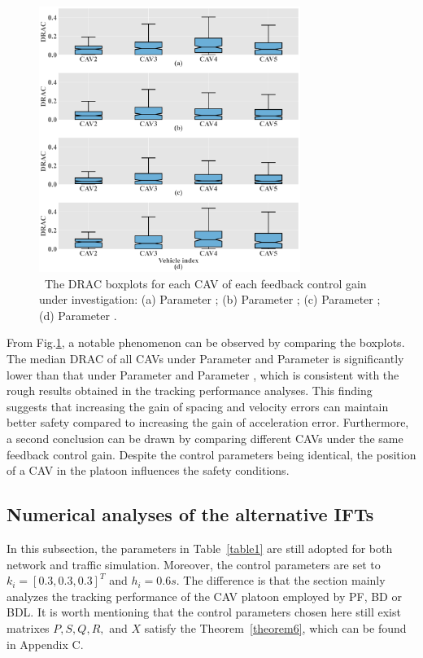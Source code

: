 \documentclass[journal]{IEEEtran}
\begin{document}
\begin{figure}

  \centering
  \includegraphics[width=8.5cm]{figs/fig8.png}
  \caption{~The DRAC boxplots for each CAV of each feedback control gain under investigation: (a) Parameter \uppercase\expandafter{}; (b) Parameter \uppercase\expandafter{}; (c) Parameter \uppercase\expandafter{}; (d) Parameter \uppercase\expandafter{}.}
  \label{fig8}
\end{figure}



From Fig.\ref{fig8}, a notable phenomenon can be observed by comparing the boxplots. The median DRAC of all CAVs under Parameter \uppercase\expandafter{} and Parameter \uppercase\expandafter{} is significantly lower than that under Parameter \uppercase\expandafter{} and Parameter \uppercase\expandafter{}, which is consistent with the rough results obtained in the tracking performance analyses. This finding suggests that increasing the gain of spacing and velocity errors can maintain better safety compared to increasing the gain of acceleration error. Furthermore, a second conclusion can be drawn by comparing different CAVs under the same feedback control gain. Despite the control parameters being identical, the position of a CAV in the platoon influences the safety conditions.

\subsection{Numerical analyses of the alternative IFTs}
\label{Section 5.3}

In this subsection, the parameters in Table~\ref{table1} are still adopted for both network and traffic simulation. Moreover, the control parameters are set to ${k_i} = {[0.3,0.3,0.3]^T}$ and ${h_i} = 0.6s $. The difference is that the section mainly analyzes the tracking performance of the CAV platoon employed by PF, BD or BDL. It is worth mentioning that the control parameters chosen here still exist matrixes $P,S,Q,R,$ and $X$ satisfy the Theorem~\ref{theorem6}, which can be found in Appendix C.
\end{document}
